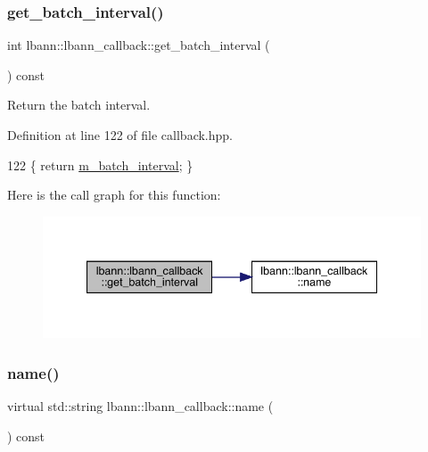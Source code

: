 \subsubsection{\texorpdfstring{get\+\_\+batch\+\_\+interval()}{get\_batch\_interval()}}
{\footnotesize\ttfamily int lbann\+::lbann\+\_\+callback\+::get\+\_\+batch\+\_\+interval (\begin{DoxyParamCaption}{ }\end{DoxyParamCaption}) const\hspace{0.3cm}{\ttfamily [inline]}}

Return the batch interval. 

Definition at line 122 of file callback.\+hpp.


\begin{DoxyCode}
122 \{ \textcolor{keywordflow}{return} \hyperlink{classlbann_1_1lbann__callback_a6126e310e9924398c18ccf76bb91c705}{m\_batch\_interval}; \}
\end{DoxyCode}
Here is the call graph for this function\+:\nopagebreak
\begin{figure}[H]
\begin{center}
\leavevmode
\includegraphics[width=340pt]{classlbann_1_1lbann__callback_acec888932129f93ba2a0077192467c9e_cgraph}
\end{center}
\end{figure}
\mbox{\label{classlbann_1_1lbann__callback_a7522c7a14f1d6a1ea762cc2d7248eb3a}} 
\subsubsection{\texorpdfstring{name()}{name()}}
{\footnotesize\ttfamily virtual std\+::string lbann\+::lbann\+\_\+callback\+::name (\begin{DoxyParamCaption}{ }\end{DoxyParamCaption}) const\hspace{0.3cm}{\ttfamily [pure virtual]}}

